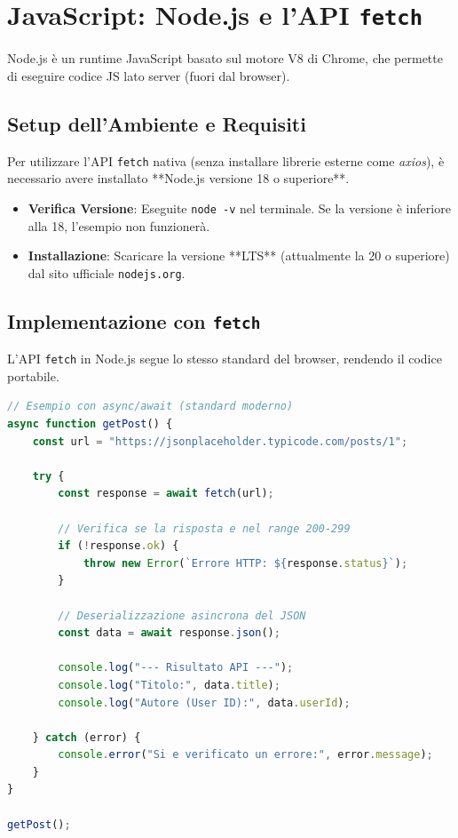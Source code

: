 \documentclass[11pt,a4paper]{report}
\begin{document}
\section{JavaScript: Node.js e l'API \texttt{fetch}}
Node.js è un runtime JavaScript basato sul motore V8 di Chrome, che permette di eseguire codice JS lato server (fuori dal browser).

\subsection{Setup dell'Ambiente e Requisiti}
Per utilizzare l'API \texttt{fetch} nativa (senza installare librerie esterne come \textit{axios}), è necessario avere installato **Node.js versione 18 o superiore**.

\begin{itemize}[leftmargin=3em]
    \item \textbf{Verifica Versione}: Eseguite \texttt{node -v} nel terminale. Se la versione è inferiore alla 18, l'esempio non funzionerà.
    \item \textbf{Installazione}: Scaricare la versione **LTS** (attualmente la 20 o superiore) dal sito ufficiale \texttt{nodejs.org}.
\end{itemize}

\subsection{Implementazione con \texttt{fetch}}
L'API \texttt{fetch} in Node.js segue lo stesso standard del browser, rendendo il codice portabile.

\begin{lstlisting}[language=javascript]
// Esempio con async/await (standard moderno)
async function getPost() {
    const url = "https://jsonplaceholder.typicode.com/posts/1";

    try {
        const response = await fetch(url);

        // Verifica se la risposta e nel range 200-299
        if (!response.ok) {
            throw new Error(`Errore HTTP: ${response.status}`);
        }

        // Deserializzazione asincrona del JSON
        const data = await response.json();

        console.log("--- Risultato API ---");
        console.log("Titolo:", data.title);
        console.log("Autore (User ID):", data.userId);

    } catch (error) {
        console.error("Si e verificato un errore:", error.message);
    }
}

getPost();
\end{lstlisting}
\end{document}
